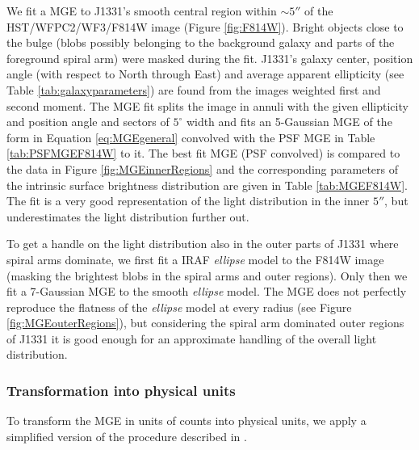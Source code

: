 \documentclass[useAMS,usenatbib]{mnras}
\begin{document}
We fit a MGE to J1331's smooth central region within $\sim 5''$ of the HST/WFPC2/WF3/F814W image (Figure \ref{fig:F814W}). Bright objects close to the bulge (blobs possibly belonging to the background galaxy and parts of the foreground spiral arm) were masked during the fit. J1331's galaxy center, position angle (with respect to North through East) and average apparent ellipticity (see Table \ref{tab:galaxyparameters}) are found from the images weighted first and second moment. The MGE fit splits the image in annuli with the given ellipticity and position angle and sectors of $5^\circ$ width and fits an 5-Gaussian MGE of the form in Equation \eqref{eq:MGEgeneral} convolved with the PSF MGE in Table \ref{tab:PSFMGEF814W} to it. The best fit MGE (PSF convolved) is compared to the data in Figure \ref{fig:MGEinnerRegions} and the corresponding parameters of the intrinsic surface brightness distribution are given in Table \ref{tab:MGEF814W}. The fit is a very good representation of the light distribution in the inner $5''$, but underestimates the light distribution further out.

To get a handle on the light distribution also in the outer parts of J1331 where spiral arms dominate, we first fit a IRAF \citep{1993ASPC...52..173T} \emph{ellipse} model to the F814W image (masking the brightest blobs in the spiral arms and outer regions). Only then we fit a 7-Gaussian MGE to the smooth \emph{ellipse} model. The MGE does not perfectly reproduce the flatness of the \emph{ellipse} model at every radius (see Figure \ref{fig:MGEouterRegions}), but considering the spiral arm dominated outer regions of J1331 it is good enough for an approximate handling of the overall light distribution.

\subsubsection{Transformation into physical units}

To transform the MGE in units of counts into physical units, we apply a simplified version of the procedure described in \citet{Holtzman}.
\end{document}
